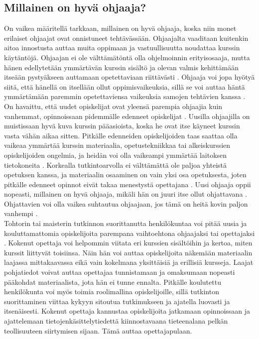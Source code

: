\documentclass[finnish]{tktltiki2}
\theoremstyle{definition}
\theoremstyle{remark}
\begin{document}
\subsection{Millainen on hyvä ohjaaja?}
On vaikea määritellä tarkkaan, millainen on hyvä ohjaaja, koska niin monet erilaiset ohjaajat ovat onnistuneet tehtävässään. Ohjaajalta vaaditaan kuitenkin aitoa innostusta auttaa muita oppimaan ja vastuullisuutta noudattaa kurssin käytäntöjä. Ohjaajan ei ole välttämätöntä olla ohjelmoinnin erityisosaaja, mutta hänen edellytetään ymmärtävän kurssin sisältö ja olevan valmis kehittämään itseään pystyäkseen auttamaan opetettaviaan riittävästi \cite{Reges88}. Ohjaaja voi jopa hyötyä siitä, että hänellä on itsellään ollut oppimisvaikeuksia, sillä se voi auttaa häntä ymmärtämään paremmin opetettaviensa vaikeuksia samojen tehtävien kanssa \cite{Decker06}.
\\
On havaittu, että uudet opiskelijat ovat yleensä parempia ohjaajia kuin vanhemmat, opinnoissaan pidemmälle edenneet opiskelijat \cite{Dickson11}. Uusilla ohjaajilla on muistissaan hyvä kuva kurssin pääasioista, koska he ovat itse käyneet kurssin vasta vähän aikaa sitten. Pitkälle edenneiden opiskelijoiden taas saattaa olla vaikeaa ymmärtää kurssin materiaalia, opetustekniikkaa tai alkeiskurssien opiskelijoiden ongelmia, ja heidän voi olla vaikeampi ymmärtää laitoksen tietokoneita \cite{Reges88}. Korkealla tutkintoarvolla ei välttämättä ole paljoa yhteistä opetuksen kanssa, ja materiaalin osaaminen on vain yksi osa opetuksesta, joten pitkälle edenneet opinnot eivät takaa menestystä opettajana \cite{Baldwin00}. Uusi ohjaaja oppii nopeasti, millainen on hyvä ohjaaja, mikäli hän on juuri itse ollut ohjattavana \cite{Vihavainen, Vikberg}. Ohjattavien voi olla vaikea suhtautua ohjaajaan, jos tämä on heitä kovin paljon vanhempi \cite{Decker06}.
\\
Tohtorin tai maisterin tutkinnon suorittanutta henkilökuntaa voi pitää uusia ja kouluttamattomia opiskelijoita parempana vaihtoehtona ohjaajaksi tai opettajaksi \cite{Baldwin00}. Kokenut opettaja voi helpommin viitata eri kurssien sisältöihin ja kertoa, miten kurssit liittyvät toisiinsa. Näin hän voi auttaa opiskelijoita näkemään materiaalin laajassa mittakaavassa eikä vain kokelmana yksittäisiä ja erillisiä kursseja. Laajat pohjatiedot voivat auttaa opettajaa tunnistamaan ja omaksumaan nopeasti pääkohdat materiaalista, jota hän ei tunne ennalta. Pitkälle koulutettu henkilökunta voi myös toimia roolimallina opiskelijoille, sillä tutkinton suorittaminen viittaa kykyyn sitoutua tutkimukseen ja ajatella luovasti ja itsenäisesti. Kokenut opettaja kannustaa opiskelijoita jatkamaan opinnoissaan ja ajattelemaan tietojenkäsittelytiedettä kiinnostavaana tieteenalana pelkän teollisuuteen siirtymisen sijaan. Tämä auttaa opettajapulaan.
\end{document}

